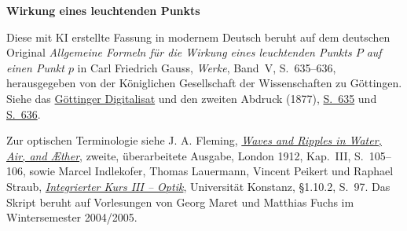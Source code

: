 \clearpage
{}
\begin{center}\textbf{Wirkung eines leuchtenden Punkts}\end{center}
\noindent Diese mit KI erstellte Fassung in modernem Deutsch beruht auf dem deutschen Original \textit{Allgemeine Formeln für die Wirkung eines leuchtenden Punkts \(P\) auf einen Punkt \(p\)} in Carl Friedrich Gauss, \textit{Werke}, Band~V, S.~635--636, herausgegeben von der Königlichen Gesellschaft der Wissenschaften zu Göttingen. Siehe das \href{https://gdz.sub.uni-goettingen.de/id/PPN236006339}{Göttinger Digitalisat} und den zweiten Abdruck (1877), \href{https://archive.org/download/Werkecarlf05gausrich/page/n646}{S.~635} und \href{https://archive.org/download/Werkecarlf05gausrich/page/n647}{S.~636}.
\par\smallskip\noindent Zur optischen Terminologie siehe J. A. Fleming, \href{https://www.gutenberg.org/ebooks/71757}{\textit{Waves and Ripples in Water, Air, and Æther}}, zweite, überarbeitete Ausgabe, London 1912, Kap.~III, S.~105--106, sowie Marcel Indlekofer, Thomas Lauermann, Vincent Peikert und Raphael Straub, \href{https://theorie.physik.uni-konstanz.de/lsfuchs/lectures/ik30405/ik3optik1802.pdf#page=97}{\textit{Integrierter Kurs III -- Optik}}, Universität Konstanz, §1.10.2, S.~97. Das Skript beruht auf Vorlesungen von Georg Maret und Matthias Fuchs im Wintersemester 2004/2005.
\clearpage
